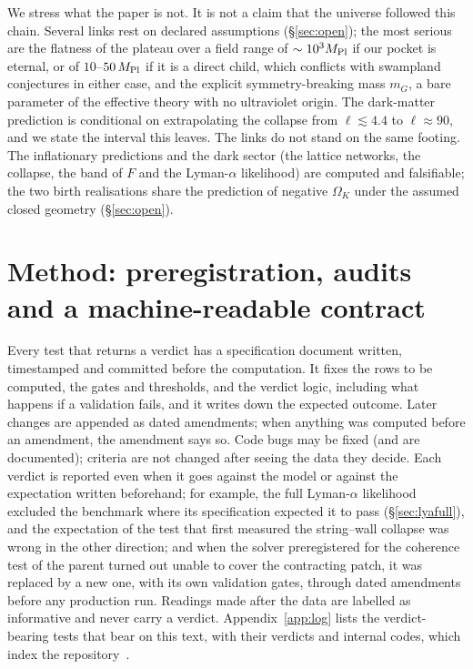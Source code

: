 \documentclass[11pt,a4paper]{article}
\newcommand{\Mpl}{M_{\rm Pl}}
\begin{document}
We stress what the paper is not.
It is not a claim that the universe followed this chain.
Several links rest on declared assumptions (\S\ref{sec:open}); the most serious are the flatness of the plateau over a field range of $\sim10^3\Mpl$ if our pocket is eternal, or of $10$--$50\,\Mpl$ if it is a direct child, which conflicts with swampland conjectures in either case, and the explicit symmetry-breaking mass $m_G$, a bare parameter of the effective theory with no ultraviolet origin.
The dark-matter prediction is conditional on extrapolating the collapse from $\ell\lesssim4.4$ to $\ell\approx90$, and we state the interval this leaves.
The links do not stand on the same footing. The inflationary predictions and the dark sector (the lattice networks, the collapse, the band of $F$ and the Lyman-$\alpha$ likelihood) are computed and falsifiable; the two birth realisations share the prediction of negative $\Omega_K$ under the assumed closed geometry (\S\ref{sec:open}).

\section{Method: preregistration, audits and a machine-readable contract}
\label{sec:method}

Every test that returns a verdict has a specification document written, timestamped and committed before the computation.
It fixes the rows to be computed, the gates and thresholds, and the verdict logic, including what happens if a validation fails, and it writes down the expected outcome.
Later changes are appended as dated amendments; when anything was computed before an amendment, the amendment says so.
Code bugs may be fixed (and are documented); criteria are not changed after seeing the data they decide.
Each verdict is reported even when it goes against the model or against the expectation written beforehand; for example, the full Lyman-$\alpha$ likelihood excluded the benchmark where its specification expected it to pass (\S\ref{sec:lyafull}), and the expectation of the test that first measured the string--wall collapse was wrong in the other direction; and when the solver preregistered for the coherence test of the parent turned out unable to cover the contracting patch, it was replaced by a new one, with its own validation gates, through dated amendments before any production run.
Readings made after the data are labelled as informative and never carry a verdict.
Appendix~\ref{app:log} lists the verdict-bearing tests that bear on this text, with their verdicts and internal codes, which index the repository~\cite{whalefall_chain}.
\end{document}
